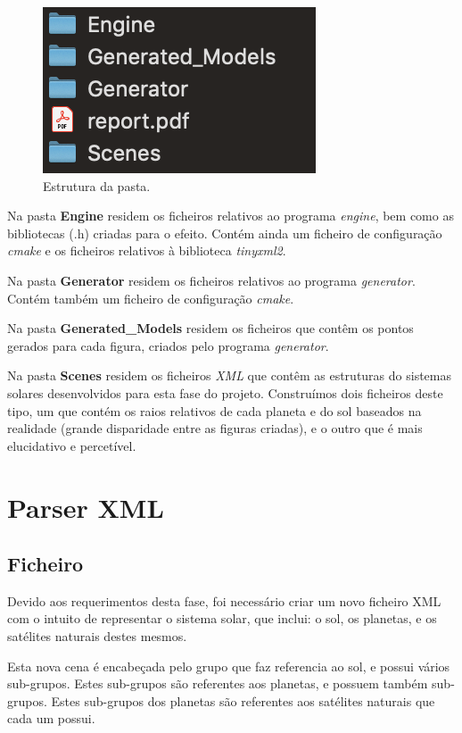 \documentclass[a4paper]{article}
\begin{document}
\begin{figure}[H]
\centering
\includegraphics[scale=1.0]{estrutura.png}
\caption{Estrutura da pasta.}
\label{img:estrutura}
\end{figure}

Na pasta \textbf{Engine} residem os ficheiros relativos ao programa \emph{engine}, bem como as bibliotecas (.h) criadas para o efeito. Contém ainda um ficheiro de configuração \emph{cmake} e os ficheiros relativos à biblioteca \emph{tinyxml2}.

Na pasta \textbf{Generator} residem os ficheiros relativos ao programa \emph{generator}. Contém também um ficheiro de configuração \emph{cmake}.

Na pasta \textbf{Generated\_Models} residem os ficheiros que contêm os pontos gerados para cada figura, criados pelo programa \emph{generator}.

Na pasta \textbf{Scenes} residem os ficheiros \emph{XML} que contêm as estruturas do sistemas solares desenvolvidos para esta fase do projeto. Construímos dois ficheiros deste tipo, um que contém os raios relativos de cada planeta e do sol baseados na realidade (grande disparidade entre as figuras criadas), e o outro que é mais elucidativo e percetível.


\newpage

\section{Parser XML}
\label{sec:parser}

\subsection{Ficheiro}
\label{sec:ficheiro}

Devido aos requerimentos desta fase, foi necessário criar um novo ficheiro XML com o intuito de representar o sistema solar, que inclui: o sol, os planetas, e os satélites naturais destes mesmos.

Esta nova cena é encabeçada pelo grupo que faz referencia ao sol, e possui vários sub-grupos. Estes sub-grupos são referentes aos planetas, e possuem também sub-grupos. Estes sub-grupos dos planetas são referentes aos satélites naturais que cada um possui.
\end{document}
